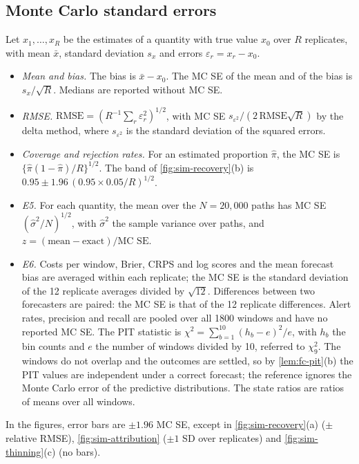 \FloatBarrier
\subsection{Monte Carlo standard errors}\label{app:sim-mcse}

Let $x_1,\dots,x_R$ be the estimates of a quantity with true value $x_0$ over $R$
replicates, with mean $\bar x$, standard deviation $s_x$ and errors $\varepsilon_r=x_r-x_0$.
\begin{itemize}
  \item \emph{Mean and bias.} The bias is $\bar x-x_0$. The MC SE of the mean and of the
  bias is $s_x/\sqrt R$. Medians are reported without MC SE.
  \item \emph{RMSE.} $\mathrm{RMSE}=(R^{-1}\sum_r\varepsilon_r^2)^{1/2}$, with MC SE
  $s_{\varepsilon^2}/(2\,\mathrm{RMSE}\sqrt R)$ by the delta method, where
  $s_{\varepsilon^2}$ is the standard deviation of the squared errors.
  \item \emph{Coverage and rejection rates.} For an estimated proportion $\hat\pi$, the
  MC SE is $\{\hat\pi(1-\hat\pi)/R\}^{1/2}$. The band of \cref{fig:sim-recovery}(b) is
  $0.95\pm1.96\,(0.95\times0.05/R)^{1/2}$.
  \item \emph{E5.} For each quantity, the mean over the $N=20{,}000$ paths has MC SE
  $(\hat\sigma^2/N)^{1/2}$, with $\hat\sigma^2$ the sample variance over paths, and
  $z=(\text{mean}-\text{exact})/\text{MC SE}$.
  \item \emph{E6.} Costs per window, Brier, CRPS and log scores and the mean forecast bias
  are averaged within each replicate; the MC SE is the standard deviation of the 12
  replicate averages divided by $\sqrt{12}$. Differences between two forecasters are
  paired: the MC SE is that of the 12 replicate differences. Alert rates, precision and
  recall are pooled over all 1800 windows and have no reported MC SE. The PIT statistic is
  $\chi^2=\sum_{b=1}^{10}(h_b-e)^2/e$, with $h_b$ the bin counts and $e$ the number of
  windows divided by 10, referred to $\chi^2_9$. The windows do not overlap and the outcomes
  are settled, so by \cref{lem:fc-pit}(b) the PIT values are independent under a correct
  forecast; the reference ignores the Monte Carlo error of the predictive distributions.
  The state ratios are ratios of means over all windows.
\end{itemize}
In the figures, error bars are $\pm1.96$ MC SE, except in \cref{fig:sim-recovery}(a)
($\pm$ relative RMSE), \cref{fig:sim-attribution} ($\pm1$ SD over replicates) and
\cref{fig:sim-thinning}(c) (no bars).

